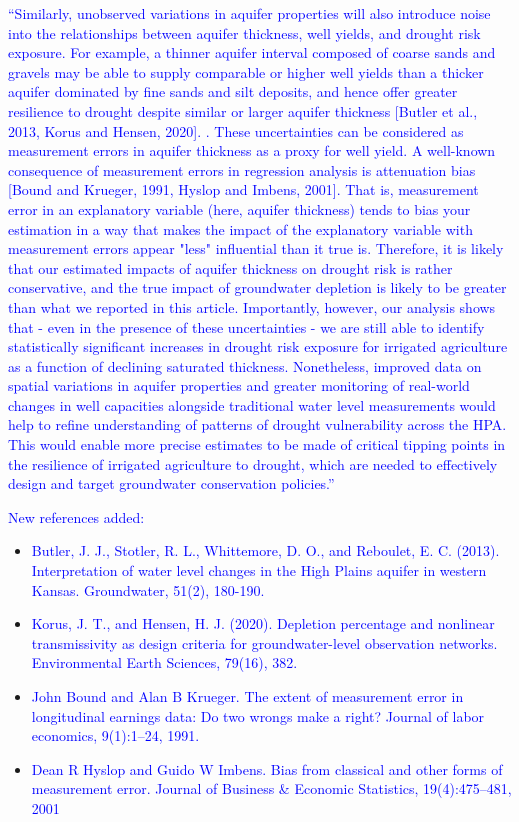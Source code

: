 \documentclass[
]{article}
\begin{document}
\textcolor{blue}{``Similarly, unobserved variations in aquifer properties will also introduce noise into the relationships between aquifer thickness, well yields, and drought risk exposure. For example, a thinner aquifer interval composed of coarse sands and gravels may be able to supply comparable or higher well yields than a thicker aquifer dominated by fine sands and silt deposits, and hence offer greater resilience to drought despite similar or larger aquifer thickness [Butler et al., 2013, Korus and Hensen, 2020]. . These uncertainties can be considered as measurement errors in aquifer thickness as a proxy for well yield. A well-known consequence of measurement errors in regression analysis is attenuation bias [Bound and Krueger, 1991, Hyslop and Imbens, 2001]. That is, measurement error in an explanatory variable (here, aquifer thickness) tends to bias your estimation in a way that makes the impact of the explanatory variable with measurement errors appear "less" influential than it true is. Therefore, it is likely that our estimated impacts of aquifer thickness on drought risk is rather conservative, and the true impact of groundwater depletion is likely to be greater than what we reported in this article. Importantly, however, our analysis shows that - even in the presence of these uncertainties - we are still able to identify statistically significant increases in drought risk exposure for irrigated agriculture as a function of declining saturated thickness. Nonetheless, improved data on spatial variations in aquifer properties and greater monitoring of real-world changes in well capacities alongside traditional water level measurements would help to refine understanding of patterns of drought vulnerability across the HPA. This would enable more precise estimates to be made of critical tipping points in the resilience of irrigated agriculture to drought, which are needed to effectively design and target groundwater conservation policies.''}

\textcolor{blue}{New references added:}

\begin{itemize}
\item
  \textcolor{blue}{Butler, J. J., Stotler, R. L., Whittemore, D. O., and Reboulet, E. C. (2013). Interpretation of water level changes in the High Plains aquifer in western Kansas. Groundwater, 51(2), 180-190.}
\item
  \textcolor{blue}{Korus, J. T., and Hensen, H. J. (2020). Depletion percentage and nonlinear transmissivity as design criteria for groundwater-level observation networks. Environmental Earth Sciences, 79(16), 382.}
\item
  \textcolor{blue}{John Bound and Alan B Krueger. The extent of measurement error in longitudinal earnings data: Do two wrongs make a right? Journal of labor economics, 9(1):1–24, 1991.}
\item
  \textcolor{blue}{Dean R Hyslop and Guido W Imbens. Bias from classical and other forms of measurement error. Journal of Business \& Economic Statistics, 19(4):475–481, 2001}
\end{itemize}
\end{document}
